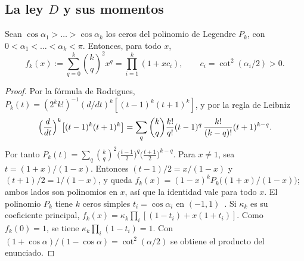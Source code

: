 \subsection{La ley \texorpdfstring{$D$}{D} y sus momentos}

\begin{lema}[Legendre]\label{lem:torres-legendre}
Sean $\cos\alpha_1>\dots>\cos\alpha_k$ los ceros del polinomio de Legendre $P_k$, con
$0<\alpha_1<\dots<\alpha_k<\pi$. Entonces, para todo $x$,
\[
 f_k(x):=\sum_{q=0}^k\binom kq^2x^q=\prod_{i=1}^k(1+xc_i),\qquad c_i=\cot^2(\alpha_i/2)>0.
\]
\end{lema}
\begin{proof}
Por la fórmula de Rodrigues, $P_k(t)=(2^kk!)^{-1}(d/dt)^k[(t-1)^k(t+1)^k]$, y por la regla de Leibniz
\[
 \Bigl(\frac{d}{dt}\Bigr)^k\bigl[(t-1)^k(t+1)^k\bigr]
 =\sum_q\binom kq\frac{k!}{q!}(t-1)^q\,\frac{k!}{(k-q)!}(t+1)^{k-q}.
\]
Por tanto $P_k(t)=\sum_q\binom kq^2\bigl(\frac{t-1}2\bigr)^q\bigl(\frac{t+1}2\bigr)^{k-q}$. Para $x\ne1$,
sea
$t=(1+x)/(1-x)$. Entonces $(t-1)/2=x/(1-x)$ y $(t+1)/2=1/(1-x)$, y queda
$f_k(x)=(1-x)^kP_k\bigl((1+x)/(1-x)\bigr)$; ambos lados son polinomios en $x$, así que la identidad vale
para todo $x$. El polinomio $P_k$ tiene $k$ ceros simples $t_i=\cos\alpha_i$ en
$(-1,1)$~\cite[Teorema~3.3.1]{Szego}. Si
$\kappa_k$ es su coeficiente principal, $f_k(x)=\kappa_k\prod_i[(1-t_i)+x(1+t_i)]$. Como $f_k(0)=1$, se
tiene $\kappa_k\prod_i(1-t_i)=1$. Con $(1+\cos\alpha)/(1-\cos\alpha)=\cot^2(\alpha/2)$ se obtiene el
producto
del enunciado.
\end{proof}

